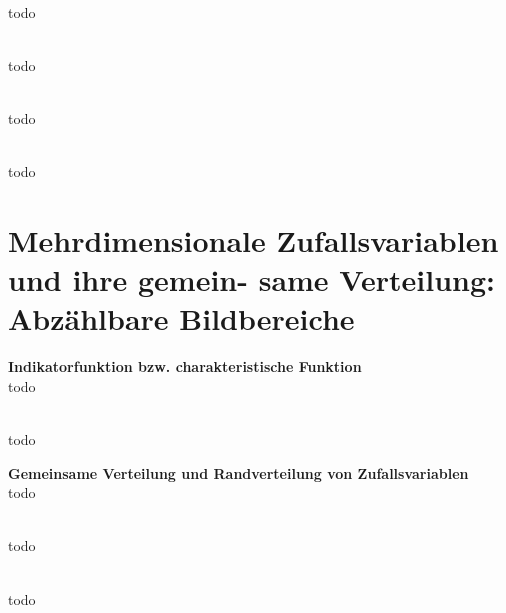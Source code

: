\begin{bsp}   \\
todo  %
\end{bsp}

\begin{bsp}   \\
todo  %
\end{bsp}

\begin{lem}   \\
todo  %
\end{lem}

\begin{lem}   \\
todo  %
\end{lem}

\section{Mehrdimensionale Zufallsvariablen und ihre gemein-
same Verteilung: Abzählbare Bildbereiche}\label{sec:mehrdimensionale-zufallsvariablen-und-ihre-gemein-
same-verteilung:-abzahlbare-bildbereiche}

\begin{defi} \textbf{Indikatorfunktion bzw. charakteristische Funktion}   \\
todo  %
\end{defi}

\begin{bsp}   \\
todo  %
\end{bsp}

\begin{defi} \textbf{Gemeinsame Verteilung und Randverteilung von Zufallsvariablen}   \\
todo  %
\end{defi}

\begin{bem}   \\
todo  %
\end{bem}

\begin{lem}   \\
todo  %
\end{lem}


